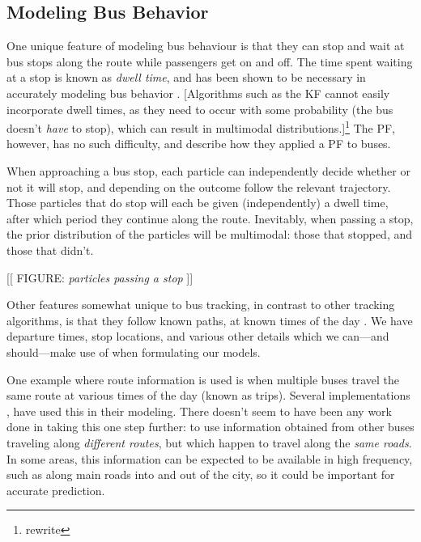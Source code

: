 \documentclass[12pt,a4paper]{article}
\begin{document}
\subsection{Modeling Bus Behavior}
\label{sec:busbehavior}


One unique feature of modeling bus behaviour is that 
they can stop and wait at bus stops along the route
while passengers get on and off.
The time spent waiting at a stop is known as \emph{dwell time},
and has been shown to be necessary in accurately modeling bus behavior \citep{cn}.
[Algorithms such as the KF cannot easily incorporate dwell times,
as they need to occur with some probability (the bus doesn't \emph{have} to stop),
which can result in multimodal distributions.]\footnote{rewrite}
The PF, however, has no such difficulty,
and \cite{hans-etal:2015} describe how they applied a PF to buses.


When approaching a bus stop,
each particle can independently decide whether or not it will stop,
and depending on the outcome follow the relevant trajectory.
Those particles that do stop will each be given (independently)
a dwell time, after which period they continue along the route.
Inevitably, when passing a stop, the prior distribution of the particles will be multimodal:
those that stopped, and those that didn't.

[[ FIGURE: \emph{particles passing a stop} ]]


Other features somewhat unique to bus tracking, 
in contrast to other tracking algorithms,
is that they follow known paths, at known times of the day \citep{cathey-dailey:2003}.
We have departure times, stop locations, 
and various other details which we can---and should---make use of 
when formulating our models.


One example where route information is used is when multiple buses travel the same 
route at various times of the day (known as trips).
Several implementations \citep{yu-etal:2011,hans-etal:2015},
have used this in their modeling.
There doesn't seem to have been any work done in taking this one step further:
to use information obtained from other buses traveling along \emph{different routes},
but which happen to travel along the \emph{same roads}.
In some areas, this information can be expected to be available in high frequency,
such as along main roads into and out of the city,
so it could be important for accurate prediction.
\end{document}
